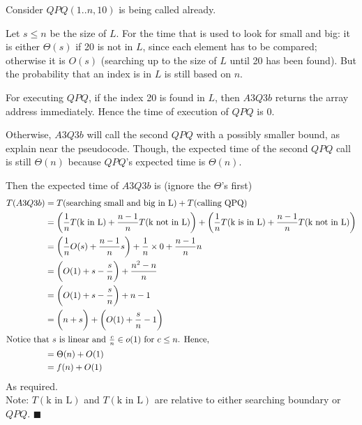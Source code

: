 \documentclass[12pt]{article}
\begin{document}
\begin{enumerate}[(a)]
Consider $QPQ(1..n,10)$ is being called already.

Let $s \le n$ be the size of $L$. For the time that is used to look for small and big: 
it is either $\Theta(s)$ if 20 is not in $L$, since each element has to be compared; otherwise it is $O(s)$ (searching up to the size of $L$ until 20 has been found).
But the probability that an index is in $L$ is still based on $n$.

For executing $QPQ$, if the index 20 is found in $L$, then $A3Q3b$ returns the array address immediately.
Hence the time of execution of $QPQ$ is $0$.

Otherwise, $A3Q3b$ will call the second $QPQ$ with a possibly smaller bound, as explain near the pseudocode.
Though, the expected time of the second $QPQ$ call is still $\Theta(n)$ because $QPQ$'s expected time is $\Theta(n)$.

Then the expected time of $A3Q3b$ is (ignore the $\Theta$'s first)
\begin{align*}
T(A3Q3b) &= T(\text{searching small and big in L}) + T(\text{calling QPQ})\\
	&= \bigg( \frac{1}{n}T(\text{k in L}) + \frac{n-1}{n}T(\text{k not in L}) \bigg) + \bigg( \frac{1}{n}T(\text{k is in L}) + \frac{n-1}{n} T(\text{k not in L}) \bigg)\\
	&= \bigg( \frac{1}{n} O(s) + \frac{n-1}{n} s \bigg) + \frac{1}{n} \times 0 +  \frac{n-1}{n} n\\
	&= \bigg( O(1) + s-\frac{s}{n} \bigg) + \frac{n^2 -n}{n}\\
	&= \bigg( O(1) + s-\frac{s}{n} \bigg) + n - 1\\
	&= \bigg( n + s \bigg) + \bigg( O(1) + \frac{s}{n} - 1\bigg)\\
\intertext{Notice that $s$ is linear and $\frac{c}{n} \in o(1)$ for $c \le n$. Hence,}
	&= \Theta(n) + O(1)\\
	&= f(n) + O(1)
\end{align*}
As required.\\
Note: $T(\text{k in L})$ and $T(\text{k in L})$ are relative to either searching boundary or $QPQ$.
\hfill $\blacksquare$

\end{enumerate}
\end{document}
